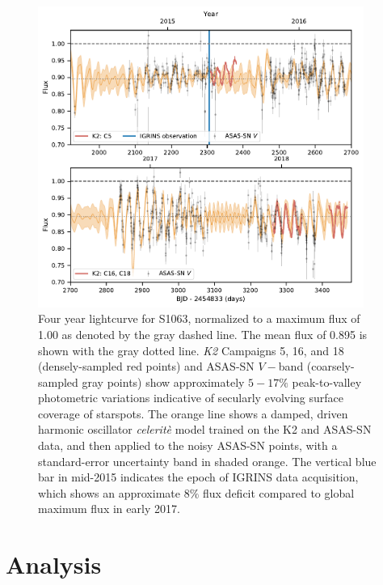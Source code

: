 \documentclass[modern,trackchanges]{aastex631}
\begin{document}
\begin{figure}[ht]
  \centering
  \includegraphics[width=0.95\textwidth]{figures/2020_K2_ASASSN_lcurve_2panel.pdf}
\caption{Four year lightcurve for S1063, normalized to a maximum flux of 1.00 as denoted by the gray dashed line. The mean flux of 0.895 is shown with the gray dotted line.  \emph{K2} Campaigns 5, 16, and 18 (densely-sampled red points) and ASAS-SN $V-$band (coarsely-sampled gray points) show approximately $5-17\%$ peak-to-valley photometric variations indicative of secularly evolving surface coverage of starspots.  The orange line shows a damped, driven harmonic oscillator \emph{celerit\`e} model \citep{2017AJ....154..220F} trained on the K2 and ASAS-SN data, and then applied to the noisy ASAS-SN points, with a standard-error uncertainty band in shaded orange. The vertical blue bar in mid-2015 indicates the epoch of IGRINS data acquisition, which shows an approximate $8\%$ flux deficit compared to global maximum flux in early 2017.}
\label{fig:lightcurve}
\end{figure}


\section{Analysis}
\label{sec:analysis}
\end{document}
